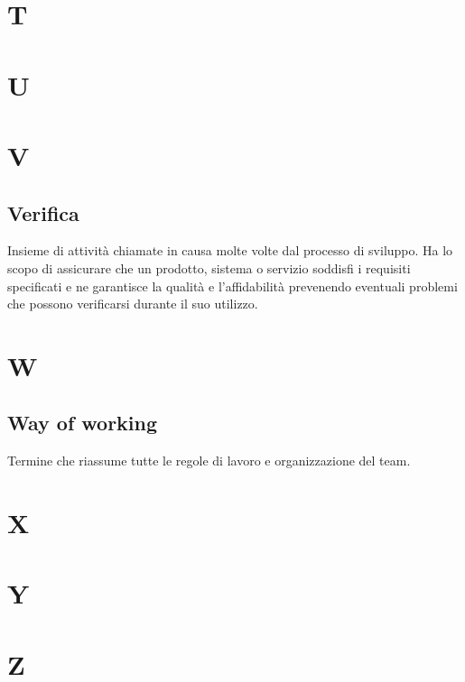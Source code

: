 \section{T}
\section{U}
\section{V}
    \subsection{Verifica}
    Insieme di attività chiamate in causa molte volte dal processo di sviluppo. Ha lo scopo di assicurare
    che un prodotto, sistema o servizio soddisfi i requisiti specificati e ne garantisce la qualità e l’affidabilità
    prevenendo eventuali problemi che possono verificarsi durante il suo utilizzo.

\section{W}
    \subsection{Way of working}
    Termine che riassume tutte le regole di lavoro e organizzazione del team.

\section{X}
\section{Y}
\section{Z}
